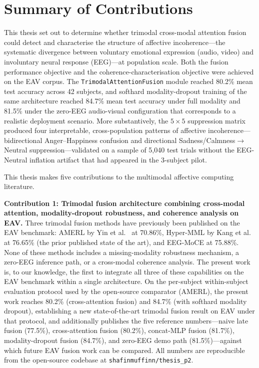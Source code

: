 \section{Summary of Contributions}
This thesis set out to determine whether trimodal cross-modal attention fusion could detect and characterise the structure of affective incoherence---the systematic divergence between voluntary emotional expression (audio, video) and involuntary neural response (EEG)---at population scale. Both the fusion performance objective and the coherence-characterisation objective were achieved on the EAV corpus. The \texttt{TrimodalAttentionFusion} module reached 80.2\% mean test accuracy across 42 subjects, and softhard modality-dropout training of the same architecture reached 84.7\% mean test accuracy under full modality and 81.5\% under the zero-EEG audio-visual configuration that corresponds to a realistic deployment scenario. More substantively, the $5\times5$ suppression matrix produced four interpretable, cross-population patterns of affective incoherence---bidirectional Anger--Happiness confusion and directional Sadness/Calmness$\rightarrow$Neutral suppression---validated on a sample of 5{,}040 test trials without the EEG-Neutral inflation artifact that had appeared in the 3-subject pilot.

This thesis makes five contributions to the multimodal affective computing literature.

\textbf{Contribution 1: Trimodal fusion architecture combining cross-modal attention, modality-dropout robustness, and coherence analysis on EAV.} Three trimodal fusion methods have previously been published on the EAV benchmark: AMERL by Yin et al.\ \cite{Yin2024AMERL} at 70.86\%, Hyper-MML by Kang et al.\ \cite{Kang2025HyperMML} at 76.65\% (the prior published state of the art), and EEG-MoCE \cite{Anon2026EEGMoCE} at 75.88\%. None of these methods includes a missing-modality robustness mechanism, a zero-EEG inference path, or a cross-modal coherence analysis. The present work is, to our knowledge, the first to integrate all three of these capabilities on the EAV benchmark within a single architecture. On the per-subject within-subject evaluation protocol used by the open-source comparator (AMERL), the present work reaches 80.2\% (cross-attention fusion) and 84.7\% (with softhard modality dropout), establishing a new state-of-the-art trimodal fusion result on EAV under that protocol, and additionally publishes the five reference numbers---naive late fusion (77.5\%), cross-attention fusion (80.2\%), concat-MLP fusion (81.7\%), modality-dropout fusion (84.7\%), and zero-EEG demo path (81.5\%)---against which future EAV fusion work can be compared. All numbers are reproducible from the open-source codebase at \texttt{shafinmuffinn/thesis\_p2}.


